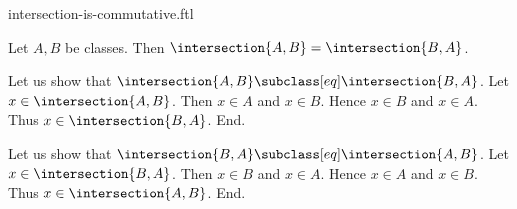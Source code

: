 \documentclass{article}
\begin{document}
\begin{smodule}[creators={Marcel Schütz}]{intersection-is-commutative.ftl}

  \begin{fproposition*}[label=8211920689561600]
    Let $A, B$ be classes.
    Then $\intersection{A,B} = \intersection{B,A}$.
  \end{fproposition*}
  \begin{fproof}
    Let us show that $\intersection{A,B} \subclass[eq] \intersection{B,A}$.
      Let $x \in \intersection{A,B}$.
      Then $x \in A$ and $x \in B$.
      Hence $x \in B$ and $x \in A$.
      Thus $x \in \intersection{B,A}$.
    End.

    Let us show that $\intersection{B,A} \subclass[eq] \intersection{A,B}$.
      Let $x \in \intersection{B,A}$.
      Then $x \in B$ and $x \in A$.
      Hence $x \in A$ and $x \in B$.
      Thus $x \in \intersection{A,B}$.
    End.
  \end{fproof}
\end{smodule}
\end{document}
